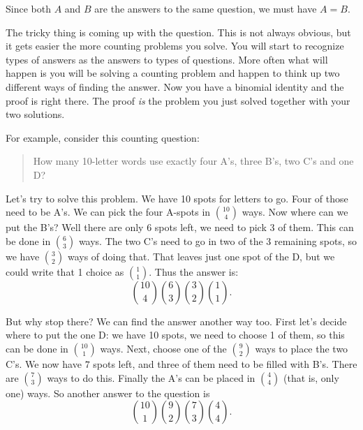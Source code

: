 \documentclass[10pt,]{book}
\theoremstyle{plain}
\theoremstyle{definition}
\theoremstyle{definition}
\theoremstyle{definition}
\numberwithin{equation}{section}
\begin{document}
      Since both \(A\) and \(B\) are the answers to the same question, we must have \(A = B\).
\par

      The tricky thing is coming up with the question. This is not always obvious, but it gets easier the more counting problems you solve. You will start to recognize types of answers as the answers to types of questions. More often what will happen is you will be solving a counting problem and happen to think up two different ways of finding the answer. Now you have a binomial identity and the proof is right there. The proof \emph{is} the problem you just solved together with your two solutions.
\par

      For example, consider this counting question:

      \begin{quote}
        How many 10-letter words use exactly four A's, three B's, two C's and one D?
      \end{quote}


      Let's try to solve this problem. We have 10 spots for letters to go. Four of those need to be A's. We can pick the four A-spots in \({10 \choose 4}\) ways. Now where can we put the B's? Well there are only 6 spots left, we need to pick \(3\) of them. This can be done in \({6 \choose 3}\) ways. The two C's need to go in two of the 3 remaining spots, so we have \({3 \choose 2}\) ways of doing that. That leaves just one spot of the D, but we could write that 1 choice as \({1 \choose 1}\). Thus the answer is:
      \begin{equation*}
        {10 \choose 4}{6 \choose 3}{3 \choose 2}{1 \choose 1}.
      \end{equation*}
\par

      But why stop there? We can find the answer another way too. First let's decide where to put the one D: we have 10 spots, we need to choose 1 of them, so this can be done in \({10 \choose 1}\) ways. Next, choose one of the \({9 \choose 2}\) ways to place the two C's. We now have \(7\) spots left, and three of them need to be filled with B's. There are \({7 \choose 3}\) ways to do this. Finally the A's can be placed in \({4 \choose 4}\) (that is, only one) ways. So another answer to the question is
      \begin{equation*}
        {10 \choose 1}{9 \choose 2}{7 \choose 3}{4 \choose 4}.
      \end{equation*}
\par
\end{document}
